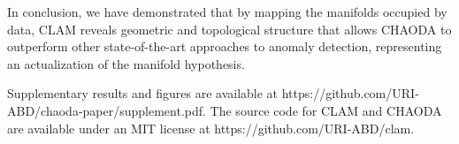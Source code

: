 In conclusion, we have demonstrated that by mapping the manifolds occupied by data, CLAM reveals geometric and topological structure that allows CHAODA to outperform other state-of-the-art approaches to anomaly detection, representing an actualization of the manifold hypothesis.

Supplementary results and figures are available at https://github.com/URI-ABD/chaoda-paper/supplement.pdf.
The source code for CLAM and CHAODA are available under an MIT license at https://github.com/URI-ABD/clam.
